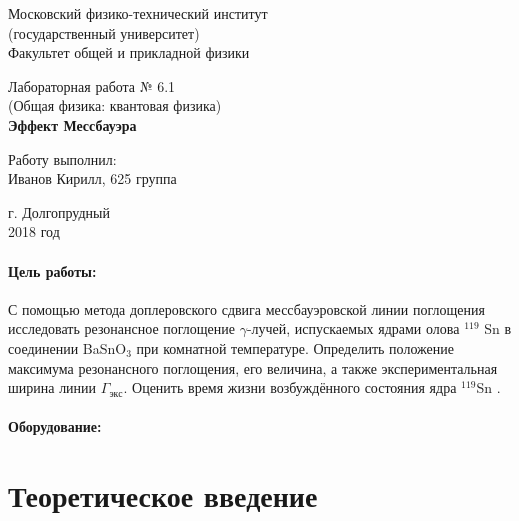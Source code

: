 \documentclass[12pt]{kiarticle} %
\begin{document}
	
	\begin{titlepage}
	\begin{center}
		\large 	Московский физико-технический институт \\
		(государственный университет) \\
		Факультет общей и прикладной физики \\
		\vspace{0.2cm}
		
		\vspace{4.5cm}
		Лабораторная работа № 6.1 \\ \vspace{0.2cm}
		\large (Общая физика: квантовая физика) \\ \vspace{0.2cm}
		\LARGE \textbf{Эффект Мессбауэра}
	\end{center}
	\vspace{2.3cm} \large
	
	\begin{center}
		Работу выполнил: \\
		Иванов Кирилл,
		625 группа
		\vspace{10mm}		
		
	\end{center}
	
	\begin{center} \vspace{60mm}
		г. Долгопрудный \\
		2018 год
	\end{center}
\end{titlepage}
	
	\paragraph*{Цель работы:} С помощью метода доплеровского сдвига мессбауэровской линии поглощения исследовать резонансное поглощение $ \gamma $-лучей, испускаемых
	ядрами олова $ ^{119} $ Sn в соединении BaSnO$_3$ при комнатной температуре.
	Определить положение максимума резонансного поглощения, его величина, а также экспериментальная ширина линии $ \Gamma_{экс}$. Оценить время жизни возбуждённого состояния ядра  $^{119}$Sn .
	
	\paragraph*{Оборудование:} 
	
	\section{Теоретическое введение} 
	
\end{document}

